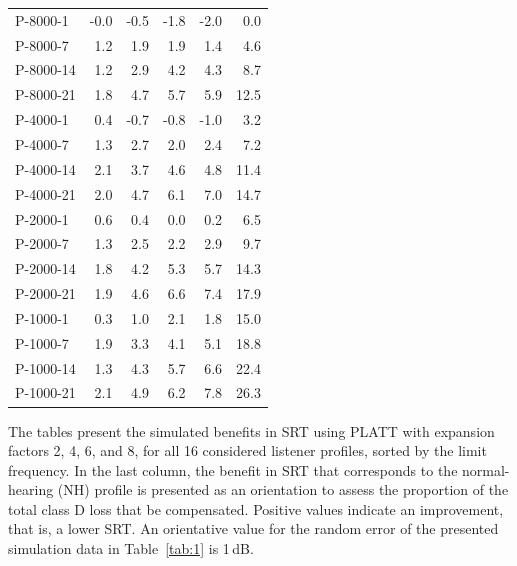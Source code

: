 \documentclass[10pt,a4paper,twocolumn]{article}
\begin{document}
\begin{table}[h]
\begin{tabular}{l|rrrr|r}
		\hline
		P-8000-1  & -0.0 & -0.5 & -1.8 & -2.0 &  0.0\\
		P-8000-7  &  1.2 &  1.9 &  1.9 &  1.4 &  4.6\\
		P-8000-14 &  1.2 &  2.9 &  4.2 &  4.3 &  8.7\\
		P-8000-21 &  1.8 &  4.7 &  5.7 &  5.9 & 12.5\\
		\hline
		P-4000-1  &  0.4 & -0.7 & -0.8 & -1.0 &  3.2\\
		P-4000-7  &  1.3 &  2.7 &  2.0 &  2.4 &  7.2\\
		P-4000-14 &  2.1 &  3.7 &  4.6 &  4.8 & 11.4\\
		P-4000-21 &  2.0 &  4.7 &  6.1 &  7.0 & 14.7\\
		\hline
		P-2000-1  &  0.6 &  0.4 &  0.0 &  0.2 &  6.5\\
		P-2000-7  &  1.3 &  2.5 &  2.2 &  2.9 &  9.7\\
		P-2000-14 &  1.8 &  4.2 &  5.3 &  5.7 & 14.3\\
		P-2000-21 &  1.9 &  4.6 &  6.6 &  7.4 & 17.9\\
		\hline
		P-1000-1  &  0.3 &  1.0 &  2.1 &  1.8 & 15.0\\
		P-1000-7  &  1.9 &  3.3 &  4.1 &  5.1 & 18.8\\
		P-1000-14 &  1.3 &  4.3 &  5.7 &  6.6 & 22.4\\
		P-1000-21 &  2.1 &  4.9 &  6.2 &  7.8 & 26.3\\
		\hline
		\hline
	\end{tabular}
\end{table}
%
The tables present the simulated benefits in SRT using PLATT with expansion factors 2, 4, 6, and 8, for all 16 considered listener profiles, sorted by the limit frequency.
%
In the last column, the benefit in SRT that corresponds to the normal-hearing (NH) profile is presented as an orientation to assess the proportion of the total class D loss that be compensated.
%
Positive values indicate an improvement, that is, a lower SRT.
%
An orientative value for the random error of the presented simulation data in Table~\ref{tab:1} is 1\,dB.
\end{document}
